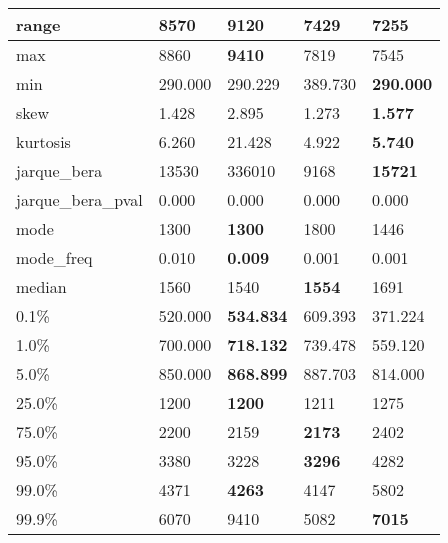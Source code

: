 \begin{table}[H]
\begin{tabular}{|l|m{10em}|m{10em}|m{10em}|m{10em}|}
\hline range & 8570 & \bfseries 9120 & 7429 & \cellcolor[rgb]{0.9, 0.54, 0.52} 7255 \\
\hline max & 8860 & \bfseries 9410 & 7819 & \cellcolor[rgb]{0.9, 0.54, 0.52} 7545 \\
\hline min & 290.000 & 290.229 & \cellcolor[rgb]{0.9, 0.54, 0.52} 389.730 & \bfseries 290.000 \\
\hline skew & 1.428 & \cellcolor[rgb]{0.9, 0.54, 0.52} 2.895 & 1.273 & \bfseries 1.577 \\
\hline kurtosis & 6.260 & \cellcolor[rgb]{0.9, 0.54, 0.52} 21.428 & 4.922 & \bfseries 5.740 \\
\hline jarque\_bera & 13530 & \cellcolor[rgb]{0.9, 0.54, 0.52} 336010 & 9168 & \bfseries 15721 \\
\hline jarque\_bera\_pval & 0.000 & 0.000 & 0.000 & 0.000 \\
\hline mode & 1300 & \bfseries 1300 & \cellcolor[rgb]{0.9, 0.54, 0.52} 1800 & 1446 \\
\hline mode\_freq & 0.010 & \bfseries 0.009 & \cellcolor[rgb]{0.9, 0.54, 0.52} 0.001 & 0.001 \\
\hline median & 1560 & 1540 & \bfseries 1554 & \cellcolor[rgb]{0.9, 0.54, 0.52} 1691 \\
\hline 0.1\% & 520.000 & \bfseries 534.834 & 609.393 & \cellcolor[rgb]{0.9, 0.54, 0.52} 371.224 \\
\hline 1.0\% & 700.000 & \bfseries 718.132 & 739.478 & \cellcolor[rgb]{0.9, 0.54, 0.52} 559.120 \\
\hline 5.0\% & 850.000 & \bfseries 868.899 & \cellcolor[rgb]{0.9, 0.54, 0.52} 887.703 & 814.000 \\
\hline 25.0\% & 1200 & \bfseries 1200 & 1211 & \cellcolor[rgb]{0.9, 0.54, 0.52} 1275 \\
\hline 75.0\% & 2200 & 2159 & \bfseries 2173 & \cellcolor[rgb]{0.9, 0.54, 0.52} 2402 \\
\hline 95.0\% & 3380 & 3228 & \bfseries 3296 & \cellcolor[rgb]{0.9, 0.54, 0.52} 4282 \\
\hline 99.0\% & 4371 & \bfseries 4263 & 4147 & \cellcolor[rgb]{0.9, 0.54, 0.52} 5802 \\
\hline 99.9\% & 6070 & \cellcolor[rgb]{0.9, 0.54, 0.52} 9410 & 5082 & \bfseries 7015 \\
\hline
\end{tabular}
\end{table}
